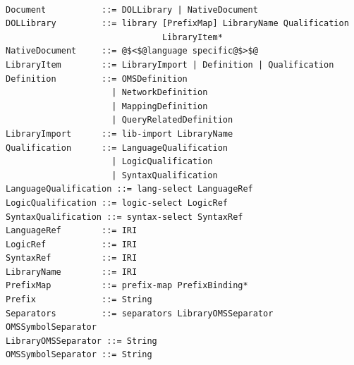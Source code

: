 \documentclass[10pt, a4paper]{isov2}
\makeatletter
\newcommand*{\eg}{e.g.\@\xspace}
\newcommand*\CommentAuthor{}
\renewcommand*\CommentAuthor{#1}}
\newcommand*\CommentDate{}
\renewcommand*\CommentDate{#1}}
\newcommand*\CommentId{}
\renewcommand*\CommentId{#1}}
\newcommand*\CommentType{}
\renewcommand*\CommentType{#1}}
\newcommand*{\SetCommentColorByType}[1]{%
\edef\localType{{#1}}%
\expandafter\ifstrequal\localType{q-aut}{\colorlet{CommentColor}{red}}{%
\expandafter\ifstrequal\localType{q-all}{\colorlet{CommentColor}{orange}}{%
\expandafter\ifstrequal\localType{todo}{\colorlet{CommentColor}{orange}}{%
\expandafter\ifstrequal\localType{fyi}{\colorlet{CommentColor}{lightgray}}{%
\colorlet{CommentColor}{yellow}}}}}}
\newcommand*{\SetCommentPrefixByType}[1]{%
\edef\localType{{#1}}%
\expandafter\@ifmtarg\localType{%
\edef\CommentPrefix{}%
}{%
\caseupper[q]{#1}%
\edef\CommentPrefix{\thestring: }%
}}
\newcommand*{\initComment}[1]{%
\setkeys{Comment}{#1}%
\SetCommentColorByType{\CommentType}%
\relax%
\SetCommentPrefixByType{\CommentType}%
\relax%
}
\newcommand*{\todonote}[2][]{%
\initComment{#1}%
\pdfcomment[author=\CommentAuthor,color=CommentColor,date=\CommentDate,id=\CommentId]{%
\CommentPrefix
#2}}
\renewcommand*{\todonote}[2][]{%
\initComment{#1}%
\ednote{\CommentPrefix #2}}
\renewcommand*{\textLF}{\\}
\makeatother
\begin{document}



\label{e:libraries}
\begin{lstlisting}[language=ebnf,escapeinside={@@}]  % abstract syntax

Document           ::= DOLLibrary | NativeDocument
DOLLibrary         ::= library [PrefixMap] LibraryName Qualification
                               LibraryItem*
NativeDocument     ::= @$<$@language specific@$>$@ 
LibraryItem        ::= LibraryImport | Definition | Qualification
Definition         ::= OMSDefinition
                     | NetworkDefinition
                     | MappingDefinition
                     | QueryRelatedDefinition
LibraryImport      ::= lib-import LibraryName
Qualification      ::= LanguageQualification
                     | LogicQualification
                     | SyntaxQualification
LanguageQualification ::= lang-select LanguageRef
LogicQualification ::= logic-select LogicRef
SyntaxQualification ::= syntax-select SyntaxRef
LanguageRef        ::= IRI
LogicRef           ::= IRI
SyntaxRef          ::= IRI
LibraryName        ::= IRI
PrefixMap          ::= prefix-map PrefixBinding*
Prefix             ::= String
Separators         ::= separators LibraryOMSSeparator OMSSymbolSeparator
LibraryOMSSeparator ::= String
OMSSymbolSeparator ::= String
\end{lstlisting}


\end{document}
